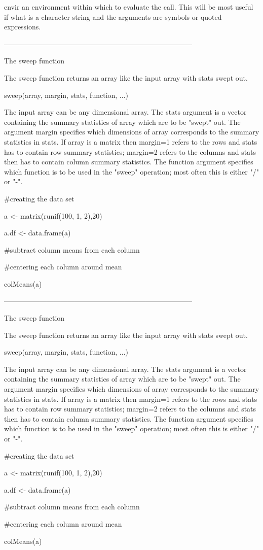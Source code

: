 envir    an environment within which to evaluate the call. This will be most useful if what is a character string and the arguments are symbols or quoted expressions.




--------------------------------------------------------------------------------


The sweep function


The sweep function returns an array like the input array with stats swept out.


sweep(array, margin, stats, function, ...)


The input array can be any dimensional array. The stats argument is a vector containing the summary statistics of array which are to be "swept" out. The argument margin specifies which dimensions of array corresponds to the summary statistics in stats. If array is a matrix then margin=1 refers to the rows and stats has to contain row summary statistics; margin=2 refers to the columns and stats then has to contain column summary statistics. The function argument specifies which function is to be used in the "sweep" operation; most often this is either "/" or "-".









#creating the data set

a <- matrix(runif(100, 1, 2),20)

a.df <- data.frame(a)

#subtract column means from each column

#centering each column around mean

colMeans(a)







--------------------------------------------------------------------------------


The sweep function


The sweep function returns an array like the input array with stats swept out.


sweep(array, margin, stats, function, ...)


The input array can be any dimensional array. The stats argument is a vector containing the summary statistics of array which are to be "swept" out. The argument margin specifies which dimensions of array corresponds to the summary statistics in stats. If array is a matrix then margin=1 refers to the rows and stats has to contain row summary statistics; margin=2 refers to the columns and stats then has to contain column summary statistics. The function argument specifies which function is to be used in the "sweep" operation; most often this is either "/" or "-".









#creating the data set

a <- matrix(runif(100, 1, 2),20)

a.df <- data.frame(a)

#subtract column means from each column

#centering each column around mean

colMeans(a)
 




